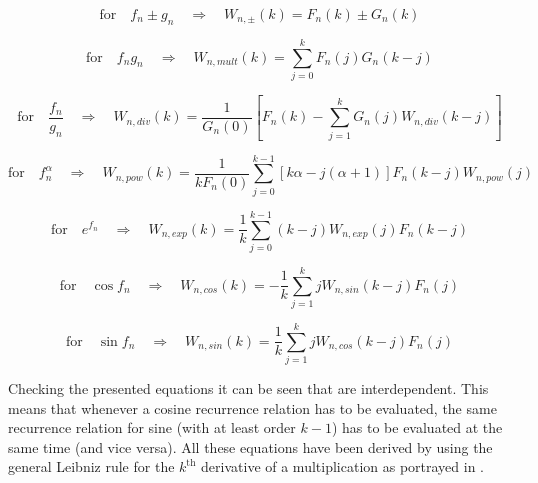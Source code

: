 \begin{equation} \label{eq:recRel1}
\text{for} \quad f_{n} \pm g_{n} \quad \Rightarrow \quad W_{n,\pm}\left(k\right)= F_{n}\left(k\right) \pm G_{n}\left(k\right)
\end{equation}

\begin{equation} \label{eq:recRel2}
\text{for} \quad f_{n}g_{n} \quad \Rightarrow \quad W_{n,mult}\left(k\right)=\displaystyle\sum_{j=0}^{k}F_{n}\left(j\right)G_{n}\left(k-j\right)
\end{equation}

\begin{equation} \label{eq:recRel3}
\text{for} \quad \dfrac{f_{n}}{g_{n}} \quad \Rightarrow \quad W_{n,div}\left(k\right)= \dfrac{1}{G_{n}\left(0\right)}\left[F_{n}\left(k\right)-\displaystyle\sum_{j=1}^{k}G_{n}\left(j\right)W_{n,div}\left(k-j\right) \right]
\end{equation}

\begin{equation} \label{eq:recRel4}
\text{for} \quad f_{n}^{\alpha} \quad \Rightarrow \quad W_{n,pow}\left(k\right)= \dfrac{1}{kF_{n}\left(0\right)} \displaystyle\sum_{j=0}^{k-1}\left[k\alpha-j\left(\alpha+1\right)\right] F_{n}\left(k-j\right)W_{n,pow}\left(j\right) 
\end{equation}

\begin{equation} \label{eq:recRel5}
\text{for} \quad e^{f_{n}} \quad \Rightarrow \quad W_{n,exp}\left(k\right)= \dfrac{1}{k}\displaystyle\sum_{j=0}^{k-1}\left(k-j\right)W_{n,exp}\left(j\right)F_{n}\left(k-j\right)
\end{equation}

\begin{equation} \label{eq:recRel6}
\text{for} \quad \cos f_{n} \quad \Rightarrow \quad W_{n,cos}\left(k\right)= -\dfrac{1}{k}\displaystyle\sum_{j=1}^{k}jW_{n,sin}\left(k-j\right)F_{n}\left(j\right)
\end{equation}

\begin{equation} \label{eq:recRel7}
\text{for} \quad \sin f_{n}  \quad \Rightarrow \quad W_{n,sin}\left(k\right)= \dfrac{1}{k}\displaystyle\sum_{j=1}^{k}jW_{n,cos}\left(k-j\right)F_{n}\left(j\right)
\end{equation}

\noindent
Checking the presented equations it can be seen that  are interdependent. This means that whenever a cosine recurrence relation has to be evaluated, the same recurrence relation for sine (with at least order $k-1$) has to be evaluated at the same time (and vice versa). All these equations have been derived by \cite{jorba2005software} using the general Leibniz rule for the $k^{\text{th}}$ derivative of a multiplication as portrayed in .

